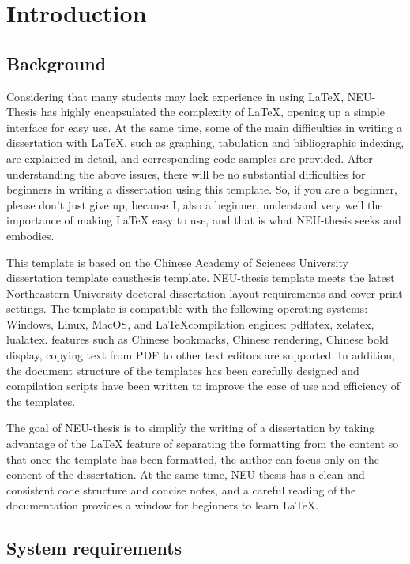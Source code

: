 \chapter{Introduction}\label{chap:introduction}

\section{Background}

Considering that many students may lack experience in using \LaTeX{}, NEU-Thesis has highly encapsulated the complexity of \LaTeX{}, opening up a simple interface for easy use. At the same time, some of the main difficulties in writing a dissertation with \LaTeX{}, such as graphing, tabulation and bibliographic indexing, are explained in detail, and corresponding code samples are provided. After understanding the above issues, there will be no substantial difficulties for beginners in writing a dissertation using this template. So, if you are a beginner, please don't just give up, because I, also a beginner, understand very well the importance of making \LaTeX{} easy to use, and that is what NEU-thesis seeks and embodies.

This template is based on the Chinese Academy of Sciences University dissertation template causthesis template. NEU-thesis template meets the latest Northeastern University doctoral dissertation layout requirements and cover print settings. The template is compatible with the following operating systems: Windows, Linux, MacOS, and \LaTeX{}compilation engines: pdflatex, xelatex, lualatex. features such as Chinese bookmarks, Chinese rendering, Chinese bold display, copying text from PDF to other text editors are supported. In addition, the document structure of the templates has been carefully designed and compilation scripts have been written to improve the ease of use and efficiency of the templates.

The goal of NEU-thesis is to simplify the writing of a dissertation by taking advantage of the \LaTeX{} feature of separating the formatting from the content so that once the template has been formatted, the author can focus only on the content of the dissertation. At the same time, NEU-thesis has a clean and consistent code structure and concise notes, and a careful reading of the documentation provides a window for beginners to learn \LaTeX{}.

\section{System requirements}\label{sec:system}

